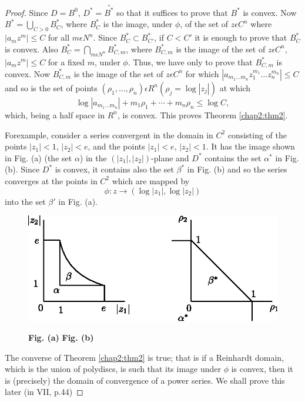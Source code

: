 \begin{proof}
Since $D=B^0$, $D^\ast = \overset{\circ}{B^\ast}$ so that it suffices
to prove that $B^\ast$ is convex. Now $B^\ast = \bigcup\limits_{C>0}
B^\ast_C$, where $B^\ast_C$ is the image, under $\phi$, of the set of
$z\epsilon C^n$ where $|a_m z^m| \leq C$ for all $m \epsilon N^n$. Since
$B^\ast_C \subset B^\ast_{C'}$, if $C<C'$ it is enough to prove that
$B^\ast_C$ is convex. Also $B^\ast_C = \bigcap\limits_{m\epsilon N^n}
B^\ast_{C,m}$, where $B^\ast_{C,m}$ is the image of the set of $z\epsilon
C^n$, $|a_m z^m| \leq C$ for a fixed $m$, under $\phi$. Thus, we have
only to prove that $B^\ast_{C,m}$ is convex. Now $B^\ast_{C,m}$ is the
image of the set of $z \epsilon C^n$ for which $\left|a_{m_1 \ldots m_n}
z_1^{m_1} \ldots z^{m_n}_{n} \right| \leq C$ and so is the set of
points $(\rho_1, \ldots , \rho_n) \epsilon R^n (\rho_j = \log |z_j|)$ at
which 
$$
\log |a_{m_1 \ldots m_n}| + m_1 \rho_1 + \cdots + m_n \rho_n \leq \log
C, 
$$
which, being a half space in $R^n$, is convex. This proves Theorem
\ref{chap2:thm2}. 

For\pageoriginale example, consider a series convergent in the domain
in $C^2$ consisting of the points $|z_1| <1$, $|z_2| <e$, and the
points $|z_1| < e$, $|z_2|<1$. It has the image shown in Fig. (a) (the
set $\alpha$) in the $(|z_1|, |z_2|)$-plane and $D^\ast$ contains the
set $\alpha^\ast$ in Fig. (b). Since $D^\ast$ is convex, it contains
also the set $\beta^\ast$ in Fig. (b) and so the series converges at
the points in $C^2$ which are mapped by 
$$
\phi : z \to (\log |z_1|, \log |z_2|) 
$$
into the set $\beta'$ in Fig. (a).

\begin{figure}[H]
\centering
\includegraphics{figures/fig2.eps}
\centerline{\textbf{Fig. (a)} \hspace{3cm} \textbf{Fig. (b)}}
\end{figure}

The converse of Theorem \ref{chap2:thm2} is true; that is if a Reinhardt domain,
which is the union of polydiscs, is such that its image under $\phi$
is convex, then it is (precisely) the domain of convergence of a power
series. We shall prove this later (in VII, p.44)
\end{proof}

